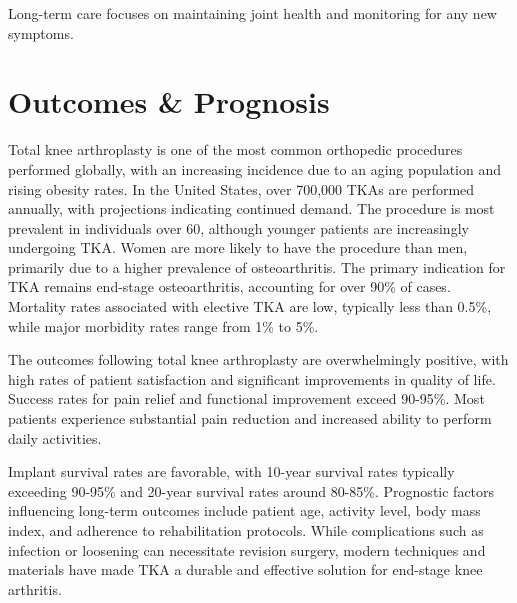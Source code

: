 Long-term care focuses on maintaining joint health and monitoring for any new symptoms.

\section*{Outcomes \& Prognosis}
Total knee arthroplasty is one of the most common orthopedic procedures performed globally, with an increasing incidence due to an aging population and rising obesity rates. In the United States, over 700,000 TKAs are performed annually, with projections indicating continued demand. The procedure is most prevalent in individuals over 60, although younger patients are increasingly undergoing TKA. Women are more likely to have the procedure than men, primarily due to a higher prevalence of osteoarthritis. The primary indication for TKA remains end-stage osteoarthritis, accounting for over 90\% of cases. Mortality rates associated with elective TKA are low, typically less than 0.5\%, while major morbidity rates range from 1\% to 5\%.

The outcomes following total knee arthroplasty are overwhelmingly positive, with high rates of patient satisfaction and significant improvements in quality of life. Success rates for pain relief and functional improvement exceed 90-95\%. Most patients experience substantial pain reduction and increased ability to perform daily activities.

Implant survival rates are favorable, with 10-year survival rates typically exceeding 90-95\% and 20-year survival rates around 80-85\%. Prognostic factors influencing long-term outcomes include patient age, activity level, body mass index, and adherence to rehabilitation protocols. While complications such as infection or loosening can necessitate revision surgery, modern techniques and materials have made TKA a durable and effective solution for end-stage knee arthritis.


